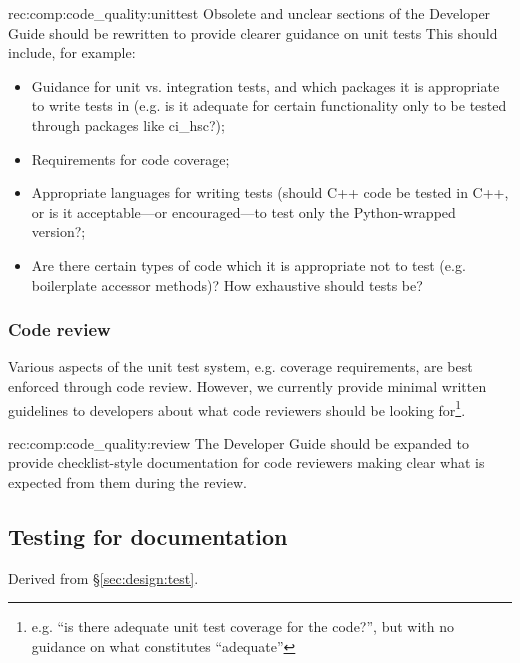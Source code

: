 \begin{recommendation}
    {rec:comp:code_quality:unittest}
    {Obsolete and unclear sections of the Developer Guide should be rewritten to provide clearer guidance on unit tests}
    This should include, for example:
\begin{itemize}

  \item{Guidance for unit vs. integration tests, and which packages it is appropriate to write tests in (e.g. is it adequate for certain functionality only to be tested through packages like ci\_hsc?);}
  \item{Requirements for code coverage;}
  \item{Appropriate languages for writing tests (should C++ code be tested in C++, or is it acceptable---or encouraged---to test only the Python-wrapped version?;}
  \item{Are there certain types of code which it is appropriate not to test (e.g. boilerplate accessor methods)? How exhaustive should tests be?}

\end{itemize}

\end{recommendation}

\subsubsection{Code review}
\label{sec:comp:code_quality:review}

Various aspects of the unit test system, e.g. coverage requirements, are best enforced through code review.
However, we currently provide minimal written guidelines to developers about what code reviewers should be looking for\footnote{e.g. ``is there adequate unit test coverage for the code?'', but with no guidance on what constitutes ``adequate''}.

\begin{recommendation}
    {rec:comp:code_quality:review}
    {The Developer Guide should be expanded to provide checklist-style documentation for code reviewers making clear what is expected from them
during the review.}
\end{recommendation}

\subsection{Testing for documentation}
\label{sec:comp:doctest}

Derived from \S\ref{sec:design:test}.

